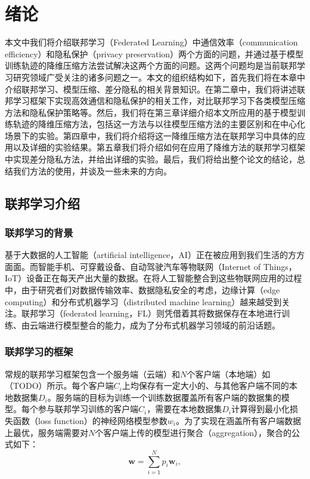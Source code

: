 
\chapter{绪论}

本文中我们将介绍联邦学习（Federated Learning）中通信效率（communication efficiency）和隐私保护（privacy preservation）两个方面的问题，并通过基于模型训练轨迹的降维压缩方法尝试解决这两个方面的问题。这两个问题均是当前联邦学习研究领域广受关注的诸多问题之一。本文的组织结构如下，首先我们将在本章中介绍联邦学习、模型压缩、差分隐私的相关背景知识。在第二章中，我们将讲述联邦学习框架下实现高效通信和隐私保护的相关工作，对比联邦学习下各类模型压缩方法和隐私保护策略等。然后，我们将在第三章详细介绍本文所应用的基于模型训练轨迹的降维压缩方法，包括这一方法与以往模型压缩方法的主要区别和在中心化场景下的实验。第四章中，我们将介绍将这一降维压缩方法在联邦学习中具体的应用以及详细的实验结果。第五章我们将介绍如何在应用了降维方法的联邦学习框架中实现差分隐私方法，并给出详细的实验。最后，我们将给出整个论文的结论，总结我们方法的使用，并谈及一些未来的方向。

\section{联邦学习介绍}

\subsection{联邦学习的背景}

基于大数据的人工智能（artificial intelligence，AI）正在被应用到我们生活的方方面面。而智能手机、可穿戴设备、自动驾驶汽车等物联网（Internet of Things，IoT）设备正在每天产出大量的数据\cite{li2020federated}。在将人工智能整合到这些物联网应用的过程中，由于研究者们对数据传输效率、数据隐私安全的考虑，边缘计算（edge computing）和分布式机器学习（distributed machine learning）越来越受到关注。联邦学习\cite{mcmahan2017communication}（federated learning，FL）则凭借着其将数据保存在本地进行训练、由云端进行模型整合的能力，成为了分布式机器学习领域的前沿话题。


\subsection{联邦学习的框架}

常规的联邦学习框架包含一个服务端（云端）和$N$个客户端（本地端）如（TODO）所示。每个客户端$C_i$上均保存有一定大小的、与其他客户端不同的本地数据集$D_i$。服务端的目标为训练一个训练数据覆盖所有客户端的数据集的模型。每个参与联邦学习训练的客户端$C_i$，需要在本地数据集$D_i$计算得到最小化损失函数（loss function）的神经网络模型参数$w_i$。为了实现在涵盖所有客户端数据上最优，服务端需要对$N$个客户端上传的模型进行聚合（aggregation），聚合的公式如下：
\begin{equation}
 \mathbf{w} = \sum_{i = 1} ^ {N} p_i\mathbf{w}_i,
\end{equation}

